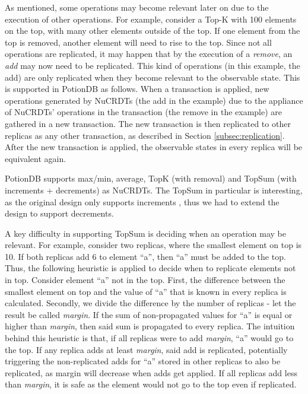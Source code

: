 \documentclass{vldb}
\newcommand{\grumbler}[2]{{\color{red}{\bf #1:} #2}}
\renewcommand{\grumbler}[2]{}
\newcommand{\andre}[1]{\grumbler{andre}{#1}}
\begin{document}
As mentioned, some operations may become relevant later on due to the execution of other operations.
For example, consider a Top-K with 100 elements on the top, with many other elements outside of the top.
If one element from the top is removed, another element will need to rise to the top.
Since not all operations are replicated, it may happen that by the execution of a \emph{remove}, an \emph{add} may now need to be replicated.
This kind of operations (in this example, the add) are only replicated when they become relevant to the observable state.
This is supported in PotionDB as follows.
When a transaction is applied, new operations generated by NuCRDTs (the add in the example) due to the appliance of NuCRDTs' operations in the transaction (the remove in the example) are gathered in a new transaction.
The new transaction is then replicated to other replicas as any other transaction, as described in Section \ref{subsec:replication}.
After the new transaction is applied, the observable states in every replica will be equivalent again.

\andre{In short, in topk, when an element is removed from the top, the replicas may diverge for a while.}

PotionDB supports max/min, average, TopK (with removal) and TopSum (with increments + decrements) as NuCRDTs.
The TopSum in particular is interesting, as the original design only supports increments \cite{Cabrita17Nonuniform}, thus we had to extend the design to support decrements.

A key difficulty in supporting TopSum is deciding when an operation may be relevant.
For example, consider two replicas, where the smallest element on top is 10.
If both replicas add 6 to element ``a'', then ``a'' must be added to the top.
Thus, the following heuristic is applied to decide when to replicate elements not in top.
Consider element ``a'' not in the top.
First, the difference between the smallest element on top and the value of ``a'' that is known in every replica is calculated.
Secondly, we divide the difference by the number of replicas - let the result be called \emph{margin}.
If the sum of non-propagated values for ``a'' is equal or higher than \emph{margin}, then said sum is propagated to every replica.
The intuition behind this heuristic is that, if all replicas were to add \emph{margin}, ``a'' would go to the top.
If any replica adds at least \emph{margin}, said add is replicated, potentially triggering the non-replicated adds for ``a'' stored in other replicas to also be replicated, as margin will decrease when adds get applied.
If all replicas add less than \emph{margin}, it is safe as the element would not go to the top even if replicated.
\end{document}
